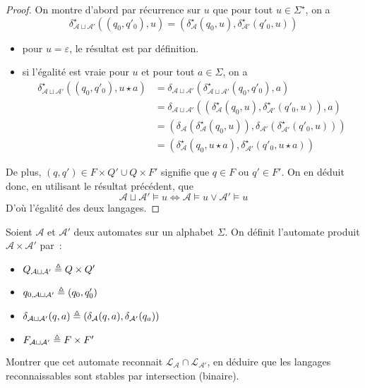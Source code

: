 \begin{proof}
  On montre d'abord par récurrence sur $u$ que pour tout $u \in \Sigma^\star$,
  on a
  \[\delta_{\mathcal A\sqcup\mathcal A'}^\star((q_0,q'_0),u) =
  (\delta_\mathcal A^\star(q_0,u),\delta_{\mathcal A'}^\star(q'_0,u))\]
  \begin{itemize}
  \item pour $u = \varepsilon$, le résultat est par définition.
  \item si l'égalité est vraie pour $u$ et pour tout $a \in \Sigma$, on a
    \begin{align*}
      \delta_{\mathcal A\sqcup\mathcal A'}^\star ((q_0,q'_0),u\star a) &=
      \delta_{\mathcal A\sqcup \mathcal A'}(
      \delta_{\mathcal A\sqcup \mathcal A'}^\star(q_0,q'_0),a)\\
      &= \delta_{\mathcal A\sqcup\mathcal A'}(
      (\delta_\mathcal A^\star(q_0,u),\delta_{\mathcal A'}^\star(q'_0,u)),a)\\
      &= (\delta_\mathcal A(\delta_\mathcal A^\star(q_0,u)),\delta_{\mathcal A'}(
      \delta_{\mathcal A'}^\star(q'_0,u)))\\
      &= (\delta_\mathcal A^\star(q_0,u\star a),
      \delta_{\mathcal A'}^\star(q'_0,u\star a))
    \end{align*}
  \end{itemize}

  De plus, $(q,q') \in F\times Q' \cup Q\times F'$ signifie que $q \in F$ ou
  $q' \in F'$. On en déduit donc, en utilisant le résultat précédent, que
  \[\mathcal A \sqcup \mathcal A'\models u \iff
  \mathcal A \models u \lor \mathcal A'\models u\]
  D'où l'égalité des deux langages.
\end{proof}

\begin{exercise}
  Soient $\mathcal A$ et $\mathcal A'$ deux automates sur un alphabet $\Sigma$.
  On définit l'automate produit $\mathcal A \times \mathcal A'$ par~:
  \begin{itemize}
  \item $Q_{\mathcal A\sqcup \mathcal A'} \triangleq Q\times Q'$
  \item $q_{0,\mathcal A\sqcup \mathcal A'} \triangleq (q_0,q'_0)$
  \item $\delta_{\mathcal A \sqcup \mathcal A'}(q,a) \triangleq (\delta_{\mathcal A}(q,a),
    \delta_{\mathcal A'}(q_a))$
  \item $F_{\mathcal A \sqcup \mathcal A'} \triangleq F\times F'$
  \end{itemize}

  Montrer que cet automate reconnait
  $\mathcal L_\mathcal A \cap \mathcal L_{\mathcal A'}$, en déduire que les
  langages reconnaissables sont stables par intersection (binaire).
\end{exercise}

